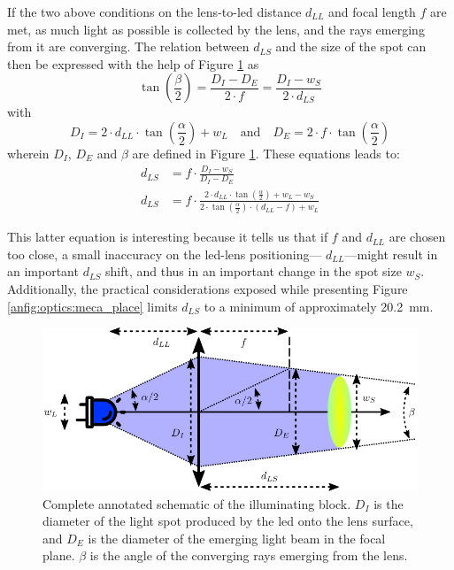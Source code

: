 If the two above conditions on the lens-to-\gls{led} distance $d_{LL}$ and focal length $f$ are met, as much light as possible is collected by the lens, and the rays emerging from it are converging. The relation between $d_{LS}$ and the size of the spot can then be expressed with the help of Figure \ref{anfig:optics:illuminating_spot} as
\begin{equation}
	\tan \left( \frac{\beta}{2} \right) = \frac{D_I - D_E}{2 \cdot f} = \frac{D_I - w_S}{2 \cdot d_{LS}}
\end{equation}
with
\begin{equation}
	D_I = 2 \cdot d_{LL} \cdot \tan \left( \frac{\alpha}{2} \right) + w_L\quad \text{and} \quad	D_E = 2 \cdot f \cdot \tan \left( \frac{\alpha}{2} \right)
\end{equation}
wherein $D_I$, $D_E$ and $\beta$ are defined in Figure \ref{anfig:optics:illuminating_spot}. These equations leads to:
\begin{equation}
	\begin{aligned}
		d_{LS} &= f \cdot \frac{D_I - w_S}{D_I - D_E}\\
		d_{LS} &= f \cdot  \frac{2\cdot d_{LL} \cdot \tan \left( \frac{\alpha}{2} \right) + w_L - w_S}{2\cdot \tan \left( \frac{\alpha}{2} \right) \cdot (d_{LL} - f) + w_L}
	\end{aligned}
\end{equation}

This latter equation is interesting because it tells us that if $f$ and $d_{LL}$ are chosen too close, a small inaccuracy on the \gls{led}-lens positioning---\ie{} $d_{LL}$---might result in an important $d_{LS}$ shift, and thus in an important change in the spot size $w_S$. Additionally, the practical considerations exposed while presenting Figure \ref{anfig:optics:meca_place} limits $d_{LS}$ to a minimum of approximately 20.2~mm.

\begin{figure}
	\centering
	\includegraphics{2_appendices/optical_figures/illuminating_spot_converted.pdf}
	\caption[Complete annotated schematic of the illuminating block.]{Complete annotated schematic of the illuminating block. $D_I$ is the diameter of the light spot produced by the \gls{led} onto the lens surface, and $D_E$ is the diameter of the emerging light beam in the focal plane. $\beta$ is the angle of the converging rays emerging from the lens.}
	\label{anfig:optics:illuminating_spot}
\end{figure}

